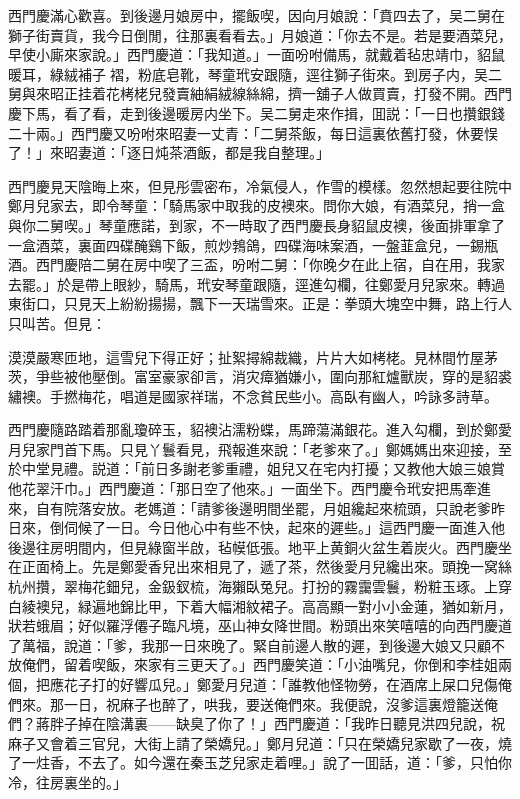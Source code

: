 西門慶滿心歡喜。到後邊月娘房中，擺飯喫，因向月娘說：「賁四去了，吴二舅在獅子街賣貨，我今日倒閒，往那裏看看去。」月娘道：「你去不是。若是要酒菜兒，早使小廝來家說。」西門慶道：「我知道。」一面吩咐備馬，就戴着毡忠靖巾，貂鼠暖耳，綠絨補子𧜽褶，粉底皂靴，琴童玳安跟隨，逕往獅子街來。到房子内，吴二舅與來昭正挂着花栲栳兒發賣紬絹絨線絲綿，擠一舖子人做買賣，打發不開。西門慶下馬，看了看，走到後邊暖房内坐下。吴二舅走來作揖，囬説：「一日也攢銀錢二十兩。」西門慶又吩咐來昭妻一丈青：「二舅茶飯，每日這裏依舊打發，休要悮了！」來昭妻道：「逐日炖茶酒飯，都是我自整理。」

西門慶見天陰晦上來，但見彤雲密布，冷氣侵人，作雪的模樣。忽然想起要往院中鄭月兒家去，即令琴童：「騎馬家中取我的皮襖來。問你大娘，有酒菜兒，捎一盒與你二舅喫。」琴童應諾，到家，不一時取了西門慶長身貂鼠皮襖，後面排軍拿了一盒酒菜，裏面四碟醃鷄下飯，煎炒鵓鴿，四碟海味案酒，一盤韮盒兒，一錫瓶酒。西門慶陪二舅在房中喫了三盃，吩咐二舅：「你晚夕在此上宿，自在用，我家去罷。」於是帶上眼紗，騎馬，玳安琴童跟隨，逕進勾欄，往鄭愛月兒家來。轉過東街口，只見天上紛紛揚揚，飄下一天瑞雪來。正是：拳頭大塊空中舞，路上行人只叫苦。但見：

\begin{myquote}
漠漠嚴寒匝地，這雪兒下得正好；扯絮撏綿裁織，片片大如栲栳。見林間竹屋茅茨，爭些被他壓倒。富室豪家卻言，消灾瘴猶嫌小，圍向那紅爐獸炭，穿的是貂裘繡襖。手撚梅花，唱道是國家祥瑞，不念貧民些小。高臥有幽人，吟詠多詩草。
\end{myquote}

西門慶隨路踏着那亂瓊碎玉，貂襖沾濡粉蝶，馬蹄蕩滿銀花。進入勾欄，到於鄭愛月兒家門首下馬。只見丫鬟看見，飛報進來說：「老爹來了。」鄭媽媽出來迎接，至於中堂見禮。説道：「前日多謝老爹重禮，姐兒又在宅内打擾；又教他大娘三娘賞他花翠汗巾。」西門慶道：「那日空了他來。」一面坐下。西門慶令玳安把馬牽進來，自有院落安放。老媽道：「請爹後邊明間坐罷，月姐纔起來梳頭，只說老爹昨日來，倒伺候了一日。今日他心中有些不快，起來的遲些。」這西門慶一面進入他後邊往房明間内，但見綠窗半啟，毡幙低張。地平上黄銅火盆生着炭火。西門慶坐在正面椅上。先是鄭愛香兒出來相見了，遞了茶，然後愛月兒纔出來。頭挽一窝絲杭州攢，翠梅花鈿兒，金鈒釵梳，海獺臥兔兒。打扮的霧靄雲鬟，粉粧玉琢。上穿白綾襖兒，緑遍地錦比甲，下着大幅湘紋裙子。高高顯一對小小金蓮，猶如新月，狀若蛾眉；好似羅浮僊子臨凡境，巫山神女降世間。粉頭出來笑嘻嘻的向西門慶道了萬福，說道：「爹，我那一日來晚了。緊自前邊人散的遲，到後邊大娘又只顧不放俺們，留着喫飯，來家有三更天了。」西門慶笑道：「小油嘴兒，你倒和李桂姐兩個，把應花子打的好響瓜兒。」鄭愛月兒道：「誰教他怪物勞，在酒席上屎口兒傷俺們來。那一日，祝麻子也醉了，哄我，要送俺們來。我便說，沒爹這裏燈籠送俺們？蔣胖子掉在陰溝裏——缺臭了你了！」西門慶道：「我昨日聽見洪四兒說，祝麻子又會着三官兒，大街上請了榮嬌兒。」鄭月兒道：「只在榮嬌兒家歇了一夜，燒了一炷香，不去了。如今還在秦玉芝兒家走着哩。」說了一囬話，道：「爹，只怕你冷，往房裏坐的。」

